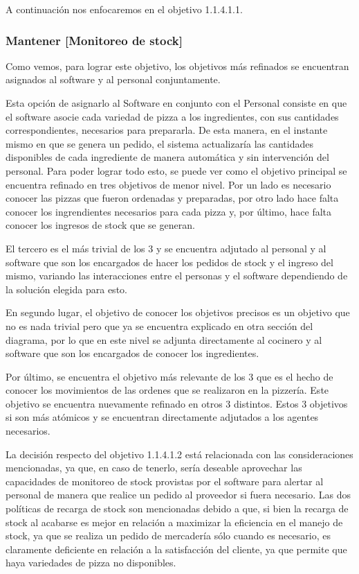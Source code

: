 \documentclass[a4paper,10pt]{article}
\begin{document}
A continuación nos enfocaremos en el objetivo 1.1.4.1.1. 

\begin{figure}[H]
\centering
{}
\caption{}
\end{figure}

\subsubsection*{Mantener [Monitoreo de stock]}
Como vemos, para lograr este objetivo, los objetivos m\'as refinados se encuentran asignados al software y al personal conjuntamente. 

Esta opción de asignarlo al Software en conjunto con el Personal consiste en que el software asocie cada variedad de pizza a los ingredientes, con sus cantidades correspondientes, necesarios para prepararla. De esta manera, en el instante mismo en que se genera un pedido, el sistema actualizaría las cantidades disponibles de cada ingrediente de manera automática y sin intervención del personal. Para poder lograr todo esto, se puede ver como el objetivo principal se encuentra refinado en tres objetivos de menor nivel. Por un lado es necesario conocer las pizzas que fueron ordenadas y preparadas, por otro lado hace falta conocer los ingrendientes necesarios para cada pizza y, por \'ultimo, hace falta conocer los ingresos de stock que se generan. 

El tercero es el m\'as trivial de los 3 y se encuentra adjutado al personal y al software que son los encargados de hacer los pedidos de stock y el ingreso del mismo, variando las interacciones entre el personas y el software dependiendo de la soluci\'on elegida para esto.

En segundo lugar, el objetivo de conocer los objetivos precisos es un objetivo que no es nada trivial pero que ya se encuentra explicado en otra secci\'on del diagrama, por lo que en este nivel se adjunta directamente al cocinero y al software que son los encargados de conocer los ingredientes.

Por \'ultimo, se encuentra el objetivo m\'as relevante de los 3 que es el hecho de conocer los movimientos de las ordenes que se realizaron en la pizzer\'ia. Este objetivo se encuentra nuevamente refinado en otros 3 distintos. Estos 3 objetivos si son m\'as at\'omicos y se encuentran directamente adjutados a los agentes necesarios.


La decisión respecto del objetivo 1.1.4.1.2 está relacionada con las consideraciones mencionadas, ya que, en caso de tenerlo, sería deseable aprovechar las capacidades de monitoreo de stock provistas por el software para alertar al personal de manera que realice un pedido al proveedor si fuera necesario. Las dos políticas de recarga de stock son mencionadas debido a que, si bien la recarga de stock al acabarse es mejor en relación a maximizar la eficiencia en el manejo de stock, ya que se realiza un pedido de mercadería sólo cuando es necesario, es claramente deficiente en relación a la satisfacción del cliente, ya que permite que haya variedades de pizza no disponibles.
\end{document}
